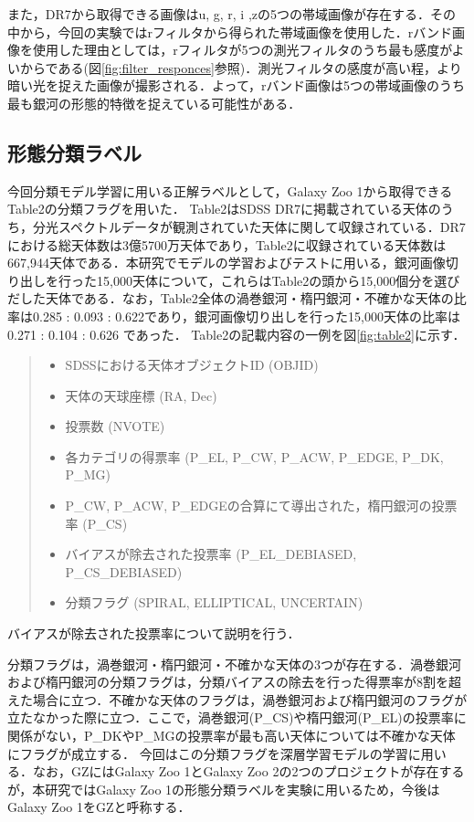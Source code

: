 \documentclass[a4j, 11pt]{jreport}
\begin{document}
また，DR7から取得できる画像はu, g, r, i ,zの5つの帯域画像が存在する．その中から，今回の実験ではrフィルタから得られた帯域画像を使用した．rバンド画像を使用した理由としては，rフィルタが5つの測光フィルタのうち最も感度がよいからである(図\ref{fig:filter_responces}参照)．測光フィルタの感度が高い程，より暗い光を捉えた画像が撮影される．よって，rバンド画像は5つの帯域画像のうち最も銀河の形態的特徴を捉えている可能性がある．

\subsection{形態分類ラベル}
今回分類モデル学習に用いる正解ラベルとして，Galaxy Zoo 1から取得できるTable2の分類フラグを用いた．
Table2はSDSS DR7に掲載されている天体のうち，分光スペクトルデータが観測されていた天体に関して収録されている．DR7における総天体数は3億5700万天体であり，Table2に収録されている天体数は667,944天体である．本研究でモデルの学習およびテストに用いる，銀河画像切り出しを行った15,000天体について，これらはTable2の頭から15,000個分を選びだした天体である．なお，Table2全体の渦巻銀河・楕円銀河・不確かな天体の比率は0.285 : 0.093 : 0.622であり，銀河画像切り出しを行った15,000天体の比率は0.271 : 0.104 : 0.626 であった．
Table2の記載内容の一例を図\ref{fig:table2}に示す．

\begin{quote}
  \begin{itemize}
   \item SDSSにおける天体オブジェクトID (OBJID)
   \item 天体の天球座標 (RA, Dec)
   \item 投票数 (NVOTE)
   \item 各カテゴリの得票率 (P\_EL, P\_CW, P\_ACW, P\_EDGE, P\_DK, P\_MG)
   \item P\_CW, P\_ACW, P\_EDGEの合算にて導出された，楕円銀河の投票率 (P\_CS)
   \item バイアスが除去された投票率 (P\_EL\_DEBIASED, P\_CS\_DEBIASED)
   \item 分類フラグ (SPIRAL, ELLIPTICAL, UNCERTAIN)
  \end{itemize}
\end{quote}

バイアスが除去された投票率について説明を行う．


分類フラグは，渦巻銀河・楕円銀河・不確かな天体の3つが存在する．渦巻銀河および楕円銀河の分類フラグは，分類バイアスの除去を行った得票率が8割を超えた場合に立つ．不確かな天体のフラグは，渦巻銀河および楕円銀河のフラグが立たなかった際に立つ．ここで，渦巻銀河(P\_CS)や楕円銀河(P\_EL)の投票率に関係がない，P\_DKやP\_MGの投票率が最も高い天体については不確かな天体にフラグが成立する．
今回はこの分類フラグを深層学習モデルの学習に用いる．なお，GZにはGalaxy Zoo 1とGalaxy Zoo 2の2つのプロジェクトが存在するが，本研究ではGalaxy Zoo 1の形態分類ラベルを実験に用いるため，今後はGalaxy Zoo 1をGZと呼称する．
\end{document}
